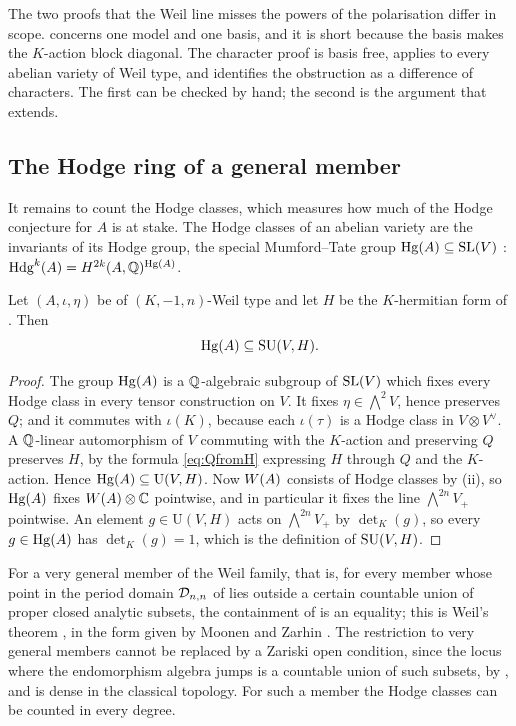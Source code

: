 \begin{remark}\label{rem:twoproofs}
The two proofs that the Weil line misses the powers of the polarisation
differ in scope.  concerns one model and one basis, and it
is short because the basis makes the $K$-action block diagonal. The
character proof is basis free, applies to every abelian variety of Weil type,
and identifies the obstruction as a difference of characters. The first can
be checked by hand; the second is the argument that 
extends.
\end{remark}

\subsection{The Hodge ring of a general member}

It remains to count the Hodge classes, which measures how much of the Hodge
conjecture for $A$ is at stake. The Hodge classes of an abelian variety are
the invariants of its Hodge group, the special Mumford--Tate group
$\operatorname{Hg}(A)\subseteq\operatorname{SL}(V)$ \cite{Del82}:
$\mathrm{Hdg}^{k}(A)=H^{2k}(A,\mathbb{Q})^{\operatorname{Hg}(A)}$.

\begin{lemma}%
\label{lem:HgSU}
Let $(A,\iota,\eta)$ be of $(K,-1,n)$-Weil type and let $H$ be the
$K$-hermitian form of . Then
\[
  \operatorname{Hg}(A)\subseteq\operatorname{SU}(V,H) .
\]
\end{lemma}

\begin{proof}
The group $\operatorname{Hg}(A)$ is a $\mathbb{Q}$-algebraic subgroup of $\operatorname{SL}(V)$ which fixes
every Hodge class in every tensor construction on $V$. It fixes
$\eta\in\bigwedge^{2}V$, hence preserves $Q$; and it commutes with $\iota(K)$,
because each $\iota(\tau)$ is a Hodge class in $V\otimes V^{\vee}$. A
$\mathbb{Q}$-linear automorphism of $V$ commuting with the $K$-action and preserving
$Q$ preserves $H$, by the formula \eqref{eq:QfromH} expressing $H$ through $Q$
and the $K$-action. Hence $\operatorname{Hg}(A)\subseteq\mathrm{U}(V,H)$. Now
$W(A)$ consists of Hodge classes by (ii), so $\operatorname{Hg}(A)$
fixes $W(A)\otimes\mathbb{C}$ pointwise, and in particular it fixes the line
$\bigwedge^{2n}V_{+}$ pointwise. An element $g\in\mathrm{U}(V,H)$ acts on
$\bigwedge^{2n}V_{+}$ by $\det_{K}(g)$,
so every $g\in\operatorname{Hg}(A)$ has $\det_{K}(g)=1$, which is the definition of
$\operatorname{SU}(V,H)$.
\end{proof}

For a very general member of the Weil family, that is, for every member whose
point in the period domain $\mathcal{D}_{n,n}$ of  lies outside
a certain countable union of proper closed analytic subsets, the containment
of  is an equality; this is Weil's theorem \cite{Weil77}, in the
form given by Moonen and Zarhin \cite{MZ99}. The restriction to very general
members cannot be replaced by a Zariski open condition, since the locus where
the endomorphism algebra jumps is a countable union of such subsets, by
, and is dense in the classical topology. For such a member the
Hodge classes can be counted in every degree.

